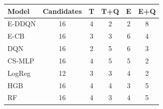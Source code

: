 \begin{tabular}{lccccc}
\toprule
Model & Candidates & T & T+Q & E & E+Q \\
\midrule
E-DDQN & 16 & 4 & 2 & 2 & 8 \\
E-CB & 16 & 3 & 3 & 6 & 4 \\
DQN & 16 & 2 & 5 & 6 & 3 \\
CS-MLP & 16 & 4 & 5 & 5 & 2 \\
LogReg & 12 & 3 & 3 & 4 & 2 \\
HGB & 16 & 4 & 4 & 3 & 5 \\
RF & 16 & 4 & 3 & 4 & 5 \\
\bottomrule
\end{tabular}

